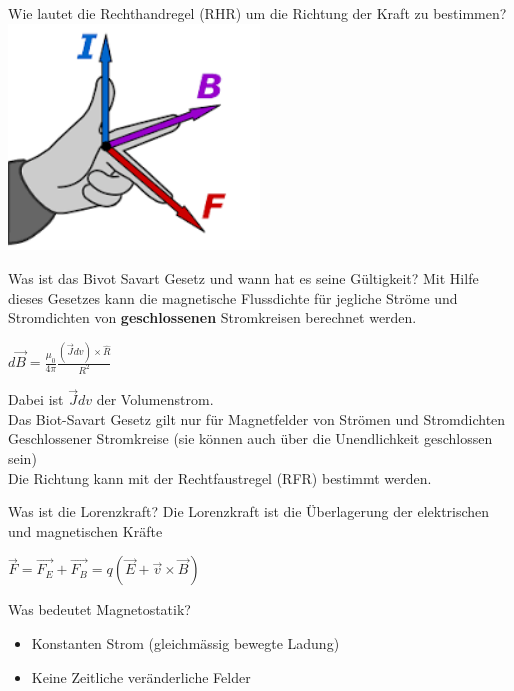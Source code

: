 \begin{karte}{Wie lautet die Rechthandregel (RHR) um die Richtung der Kraft zu bestimmen?}
	\center \includegraphics[width=0.5\textwidth]{pics/MS_RHR.png}
\end{karte}

\begin{karte}{Was ist das Bivot Savart Gesetz und wann hat es seine Gültigkeit?}
	Mit Hilfe dieses Gesetzes kann die magnetische Flussdichte für jegliche Ströme und Stromdichten von \textbf{geschlossenen} Stromkreisen berechnet werden.
	\begin{center}
		\begin{huge}
			$d \vec{B}=\frac{\mu_{0}}{4 \pi} \frac{(\vec{J} d v) \times \hat{R}}{R^{2}}$
		\end{huge}
	\end{center}
	Dabei ist $\vec{J} d v$ der Volumenstrom.\\[5pt]
	Das Biot-Savart Gesetz gilt nur für Magnetfelder von Strömen und Stromdichten Geschlossener Stromkreise (sie können auch über die Unendlichkeit geschlossen sein)\\[5pt]
	Die Richtung kann mit der Rechtfaustregel (RFR) bestimmt werden.
\end{karte}

\begin{karte}{Was ist die Lorenzkraft?}
	Die Lorenzkraft ist die Überlagerung der elektrischen und magnetischen Kräfte\\
	\begin{center}
		\begin{huge}
			$\vec{F}=\vec{F_{E}}+\vec{F_{B}}=q(\vec{E}+\vec{v} \times \vec{B})$
		\end{huge}
	\end{center}
\end{karte}

\begin{karte}{Was bedeutet Magnetostatik?}
	\begin{itemize}
		\item Konstanten Strom (gleichmässig bewegte Ladung)
		\item Keine Zeitliche veränderliche Felder
	\end{itemize}
\end{karte}

